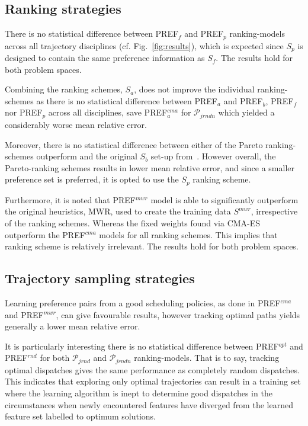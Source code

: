 \documentclass[letterpaper]{article}
\newcommand{\PREF}[2]{PREF$_{#2}^{#1}$}
\begin{document}
 
 
\subsection{Ranking strategies}\label{sec:expr:rank}
There is no statistical difference between \PREF{}{f} and \PREF{}{p} ranking-models across all trajectory disciplines (cf. 
Fig.~\ref{fig:results}), which is expected since $S_p$ is designed to contain 
the same preference information as $S_f$. The results hold for both problem spaces. 

Combining the ranking schemes, $S_{a}$, does not improve the individual ranking-schemes as there is no statistical difference between \PREF{}{a} and \PREF{}{b}, \PREF{}{f} nor \PREF{}{p}  across all  disciplines, save \PREF{cma}{a} for $\mathcal{P}_{jrndn}$ which yielded a considerably worse mean relative error. 

Moreover, there is no statistical difference between either of the Pareto ranking-schemes outperform and the original $S_b$ set-up from~\cite{InRu11a}. However overall, the Pareto-ranking schemes results in lower mean relative error, and since a smaller preference set is preferred, it is opted to use the $S_{p}$ ranking scheme. 

Furthermore, it is noted that \PREF{mwr}{} model is able to significantly outperform the original heuristics, MWR, used to create the training data $S^{mwr}$, irrespective of the ranking schemes. Whereas the fixed weights found via CMA-ES outperform the \PREF{cma}{} models for all ranking schemes. This implies that ranking scheme is relatively irrelevant. The results hold for both problem spaces. 

\subsection{Trajectory sampling strategies}\label{sec:expr:track}
Learning preference pairs from a good scheduling policies, as done  in \PREF{cma}{} and \PREF{mwr}{}, can give favourable results, however tracking optimal paths yields generally a lower mean relative error. 

It is particularly interesting there is no statistical difference between \PREF{opt}{} and \PREF{rnd}{} for both 
$\mathcal{P}_{jrnd}$ and $\mathcal{P}_{jrndn}$ ranking-models. That is to say, tracking optimal dispatches gives the same performance as completely random dispatches. This indicates that exploring 
only optimal trajectories can result in a training set where the learning algorithm is inept to determine good 
dispatches in the circumstances when newly encountered features have diverged from the learned feature set labelled to optimum solutions. 
\end{document}

